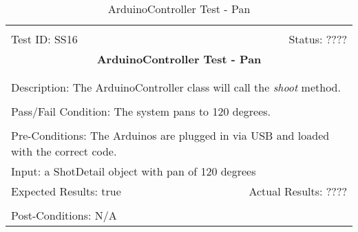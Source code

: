 \documentclass[11pt]{article}
\begin{document}
\begin{center}
\begin{table}[H]
\begin{tabular}{|l r|}\hline&\\[-2mm]
	Test ID: SS16	&Status: ????\\[-3mm]
	\multicolumn{2}{|c|}{\textbf{\large{ArduinoController Test - Pan}}}\\&\\\hline&\\[-3mm]
	\multicolumn{2}{|p{\textwidth}|}{Description: The ArduinoController class will call the \textit{shoot} method.}\\[1mm]\hline&\\[-3mm]
	\multicolumn{2}{|p{\textwidth}|}{Pass/Fail Condition: The system pans to 120 degrees.}\\[1mm]\hline&\\[-3mm]
	\multicolumn{2}{|p{\textwidth}|}{Pre-Conditions: The Arduinos are plugged in via USB and loaded with the correct code.}\\[4mm]
	\multicolumn{2}{|p{\textwidth}|}{Input: a ShotDetail object with pan of 120 degrees}\\[2mm]\hline
	\multicolumn{1}{|p{0.49\textwidth}}{Expected Results: true}	&\multicolumn{1}{|p{0.45\textwidth}|}{Actual Results: ????}\\\hline&\\[-3mm]
	\multicolumn{2}{|p{\textwidth}|}{Post-Conditions: N/A}\\\hline
\end{tabular}
\caption{ArduinoController Test - Pan}
\end{table}
\end{center}
\end{document}
